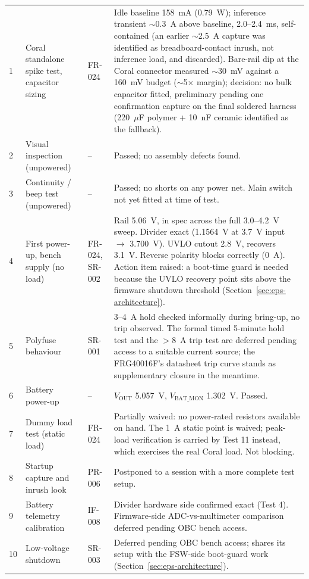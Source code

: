 \begin{longtable}{p{0.9cm}p{3.2cm}p{1.6cm}p{8.5cm}}
1 & Coral standalone spike test, capacitor sizing & FR-024 & Idle baseline 158~mA (0.79~W); inference transient $\sim$0.3~A above baseline, 2.0--2.4~ms, self-contained (an earlier $\sim$2.5~A capture was identified as breadboard-contact inrush, not inference load, and discarded). Bare-rail dip at the Coral connector measured $\sim$30~mV against a 160~mV budget ($\sim$5$\times$ margin); decision: no bulk capacitor fitted, preliminary pending one confirmation capture on the final soldered harness (220~$\mu$F polymer + 10~nF ceramic identified as the fallback). \\
2 & Visual inspection (unpowered) & -- & Passed; no assembly defects found. \\
3 & Continuity / beep test (unpowered) & -- & Passed; no shorts on any power net. Main switch not yet fitted at time of test. \\
4 & First power-up, bench supply (no load) & FR-024, SR-002 & Rail 5.06~V, in spec across the full 3.0--4.2~V sweep. Divider exact (1.1564~V at 3.7~V input $\to$ 3.700~V). UVLO cutout 2.8~V, recovers 3.1~V. Reverse polarity blocks correctly (0~A). Action item raised: a boot-time guard is needed because the UVLO recovery point sits above the firmware shutdown threshold (Section~\ref{sec:eps-architecture}). \\
5 & Polyfuse behaviour & SR-001 & 3--4~A hold checked informally during bring-up, no trip observed. The formal timed 5-minute hold test and the $>$8~A trip test are deferred pending access to a suitable current source; the FRG40016F's datasheet trip curve stands as supplementary closure in the meantime. \\
6 & Battery power-up & -- & $V_\text{OUT}$ 5.057~V, $V_\text{BAT\_MON}$ 1.302~V. Passed. \\
7 & Dummy load test (static load) & FR-024 & Partially waived: no power-rated resistors available on hand. The 1~A static point is waived; peak-load verification is carried by Test 11 instead, which exercises the real Coral load. Not blocking. \\
8 & Startup capture and inrush look & PR-006 & Postponed to a session with a more complete test setup. \\
9 & Battery telemetry calibration & IF-008 & Divider hardware side confirmed exact (Test 4). Firmware-side ADC-vs-multimeter comparison deferred pending OBC bench access. \\
10 & Low-voltage shutdown & SR-003 & Deferred pending OBC bench access; shares its setup with the FSW-side boot-guard work (Section~\ref{sec:eps-architecture}). \\

\end{longtable}

